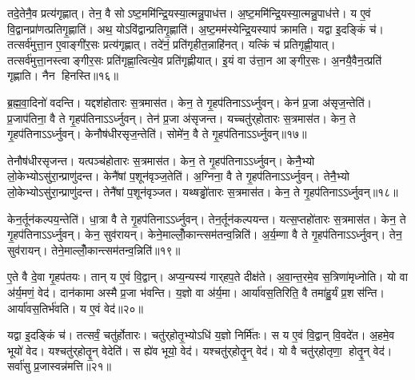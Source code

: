 तदे॒तेनै॒व प्रत्य॑गृह्णात्।
तेन॒ वै सोऽष्ट॒ममि॑न्द्रि॒यस्या॒त्मन्नु॒पाध॑त्त।
अ॒ष्ट॒ममि॑न्द्रि॒यस्या॒त्मन्नु॒पाध॑त्ते।
य ए॒वं वि॒द्वानप्रा॑णत्प्रतिगृ॒ह्णाति॑।
अथ॒ योऽवि॑द्वान्प्रतिगृ॒ह्णाति॑।
अ॒ष्ट॒मम॑स्येन्द्रि॒यस्याप॑ क्रामति।
यद्वा इ॒दङ्किं च॑।
तत्सर्व॑मुत्ता॒न ए॒वाङ्गी॑र॒सः प्रत्य॑गृह्णात्।
तदे॑नं॒ प्रति॑गृहीत॒न्नाहि॑नत्।
यत्किं च॑ प्रतिगृह्णी॒यात्।
तत्सर्व॑मुत्ता॒नस्त्वाङ्गीर॒सः प्रति॑गृह्णा॒त्वित्ये॒व प्रति॑गृह्णीयात्।
इ॒यं वा उ॑त्ता॒न आङ्गीर॒सः।
अ॒नयै॒वैन॒त्प्रति॑ गृह्णाति।
नैन हिनस्ति॥१६॥\anuvakamend[तृती॑यमिन्द्रि॒यस्यापाक्रामच्चतु॒र्थमि॑न्द्रि॒यस्या॒त्मन्नु॒पाध॒त्ताश्वं॑ प्रतिगृ॒ह्णाति॑ ष॒ष्ठम॑स्येन्द्रि॒यस्याप॑क्रामत्यष्ट॒ममि॑न्द्रि॒यस्यापाक्रामत्प्रतिगृह्णी॒याच्च॒त्वारि॑ च (तस्य॒ वा अ॒ग्नेर्‌हिर॑ण्य॒ सोम॑स्य॒ वास॒स्तदे॒तेन॑ रु॒द्रस्य॒ गान्तामे॒तेन॒ वरु॑ण॒स्याश्वं॑ प्र॒जाप॑ते॒ पुरु॑षं॒ मनो॒स्तल्प॒न्तमे॒तेनोत्ता॒नस्य॒ तदे॒तेनाप्रा॑ण॒द्यद्वै।
अ॒र्धं तृती॑यमष्ट॒मं तच्च॑तु॒र्थं तां प॑ञ्च॒म ष॒ष्ठ स॑प्त॒मन्तम्।
तदे॒तेन॒ द्वे तामे॒तेनैकं॒ तमे॒तेन॒ त्रीणि॒ तदे॒तेनैकम्॥)]

ब्र॒ह्म॒वा॒दिनो॑ वदन्ति।
यद्दश॑होतारः स॒त्रमास॑त।
केन॒ ते गृ॒हप॑तिनाऽऽर्ध्नुवन्।
केन॑ प्र॒जा अ॑सृज॒न्तेति॑।
प्र॒जाप॑तिना॒ वै ते गृ॒हप॑तिनाऽऽर्ध्नुवन्।
तेन॑ प्र॒जा अ॑सृजन्त।
यच्चतु॑र्‌होतारः स॒त्रमास॑त।
केन॒ ते गृ॒हप॑तिनाऽऽर्ध्नुवन्।
केनौष॑धीरसृज॒न्तेति॑।
सोमे॑न॒ वै ते गृ॒हप॑तिनाऽऽर्ध्नुवन्॥१७॥

तेनौष॑धीरसृजन्त।
यत्पञ्च॑होतारः स॒त्रमास॑त।
केन॒ ते गृ॒हप॑तिनाऽऽर्ध्नुवन्।
केनै॒भ्यो लो॒केभ्योऽसु॑रा॒न्प्राणु॑दन्त।
केनै॑षां प॒शून॑वृञ्ज॒तेति॑।
अ॒ग्निना॒ वै ते गृ॒हप॑तिनाऽऽर्ध्नुवन्।
तेनै॒भ्यो लो॒केभ्योऽसु॑रा॒न्प्राणु॑दन्त।
तेनै॑षां प॒शून॑वृञ्जत।
यथ्षड्ढो॑तारः स॒त्रमास॑त।
केन॒ ते गृ॒हप॑तिनाऽऽर्ध्नुवन्॥१८॥

केन॒र्तून॑कल्पय॒न्तेति॑।
धा॒त्रा वै ते गृ॒हप॑तिनाऽऽर्ध्नुवन्।
तेन॒र्तून॑कल्पयन्त।
यत्स॒प्तहो॑तारः स॒त्रमास॑त।
केन॒ ते गृ॒हप॑तिनाऽऽर्ध्नुवन्।
केन॒ सुव॑रायन्।
केने॒माल्लोँ॒कान्त्सम॑तन्व॒न्निति॑।
अ॒र्य॒म्णा वै ते गृ॒हप॑तिनाऽऽर्ध्नुवन्।
तेन॒ सुव॑रायन्।
तेने॒माल्लोँ॒कान्त्सम॑तन्व॒न्निति॑॥१९॥

ए॒ते वै दे॒वा गृ॒हप॑तयः।
तान् य ए॒वं वि॒द्वान्।
अप्य॒न्यस्य॑ गार्‌हप॒ते दीक्ष॑ते।
अ॒वा॒न्त॒रमे॒व स॒त्रिणा॑मृध्नोति।
यो वा अ॑र्य॒मणं॒ वेद॑।
दान॑कामा अस्मै प्र॒जा भ॑वन्ति।
य॒ज्ञो वा अ॑र्य॒मा।
आर्या॑वस॒तिरिति॒ वै तमा॑हु॒र्यं प्र॒शस॑न्ति।
आर्या॑वस॒तिर्भ॑वति।
य ए॒वं वेद॑॥२०॥

यद्वा इ॒दङ्किं च॑।
तत्सर्वं॒ चतु॑र्\mbox{}होतारः।
चतु॑र्‌होतृ॒भ्योऽधि॑ य॒ज्ञो निर्मि॑तः।
स य ए॒वं वि॒द्वान्‌ वि॒वदे॑त।
अ॒हमे॒व भूयो॑ वेद।
यश्चतु॑र्‌होतॄ॒न् वेदेति॑।
स ह्ये॑व भूयो॒ वेद॑।
यश्चतु॑र्‌होतॄ॒न् वेद॑।
यो वै चतु॑र्‌होतृणा॒ होतॄ॒न् वेद॑।
सर्वा॑सु प्र॒जास्वन्न॑मत्ति॥२१॥

